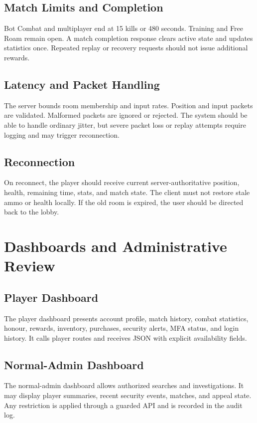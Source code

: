\documentclass[12pt,a4paper,oneside]{report}
\begin{document}
\section{Match Limits and Completion}
Bot Combat and multiplayer end at 15 kills or 480 seconds. Training and Free Roam remain open. A match completion response clears active state and updates statistics once. Repeated replay or recovery requests should not issue additional rewards.

\section{Latency and Packet Handling}
The server bounds room membership and input rates. Position and input packets are validated. Malformed packets are ignored or rejected. The system should be able to handle ordinary jitter, but severe packet loss or replay attempts require logging and may trigger reconnection.

\section{Reconnection}
On reconnect, the player should receive current server-authoritative position, health, remaining time, stats, and match state. The client must not restore stale ammo or health locally. If the old room is expired, the user should be directed back to the lobby.

\chapter{Dashboards and Administrative Review}
\section{Player Dashboard}
The player dashboard presents account profile, match history, combat statistics, honour, rewards, inventory, purchases, security alerts, MFA status, and login history. It calls player routes and receives JSON with explicit availability fields.

\section{Normal-Admin Dashboard}
The normal-admin dashboard allows authorized searches and investigations. It may display player summaries, recent security events, matches, and appeal state. Any restriction is applied through a guarded API and is recorded in the audit log.
\end{document}
